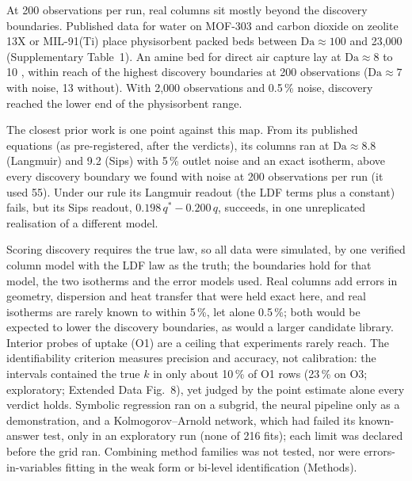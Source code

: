 \documentclass[11pt]{article}
\newcommand{\Da}{\mathrm{Da}}
\newcommand{\qs}{q^{*}}
\begin{document}
At 200 observations per run, real columns sit mostly beyond the discovery boundaries. Published data for water on MOF-303
\citep{lassitter2024} and carbon dioxide on zeolite 13X \citep{dantas2011} or MIL-91(Ti)
\citep{krishnamurthy2025} place physisorbent packed beds between $\Da \approx 100$ and 23{,}000
(Supplementary Table~1). An amine bed for
direct air capture lay at $\Da \approx 8$ to 10 \citep{stampi2024}, within reach of the highest
discovery boundaries at 200 observations ($\Da \approx 7$ with noise, 13 without). With 2,000 observations and 0.5\,\% noise, discovery reached the lower end of the physisorbent range.

The closest prior work \citep{santana2023} is one point against this map. From its published
equations (as pre-registered, after the verdicts), its columns ran at $\Da \approx 8.8$
(Langmuir) and 9.2 (Sips) with 5\,\% outlet noise and an exact isotherm, above every discovery
boundary we found with noise at 200 observations per run (it used 55). Under our rule its Langmuir readout (the LDF terms plus a constant)
fails, but its Sips readout, $0.198\,\qs - 0.200\,q$, succeeds, in one unreplicated realisation of a different model.



Scoring discovery requires the true law, so all data were simulated, by one verified column model with
the LDF law as the truth; the boundaries hold for that model, the two isotherms and the error models used. Real columns add errors in geometry, dispersion and heat transfer that were
held exact here, and real isotherms are rarely known to within 5\,\%, let alone 0.5\,\%; both would be expected to
lower the discovery boundaries, as would a larger candidate library. Interior probes of uptake
(O1) are a ceiling that experiments rarely reach. The identifiability criterion measures precision
and accuracy, not calibration: the intervals contained the true $k$ in only about 10\,\% of O1 rows
(23\,\% on O3; exploratory; Extended Data Fig.~8), yet judged by the point estimate alone every
verdict holds.
Symbolic regression ran on a subgrid, the neural pipeline only as a demonstration, and a
Kolmogorov--Arnold network, which had failed its known-answer test, only in an exploratory run (none
of 216 fits); each limit was declared before the grid ran.
Combining method families was not tested, nor were errors-in-variables fitting in the weak form or
bi-level identification \citep{li2025bilevel} (Methods).
\end{document}
